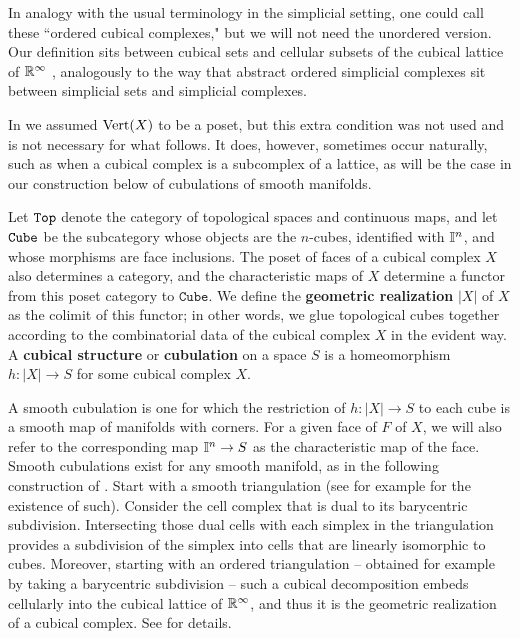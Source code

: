 In analogy with the usual terminology in the simplicial setting, one could call these ``ordered cubical complexes," but we will not need the unordered version.
Our definition sits between cubical sets \cite{jardine2002cubical} and cellular subsets of the cubical lattice of $\mathbb{R}^\infty$ \cite{kaczynski2006computational}, analogously to the way that abstract ordered simplicial complexes sit between simplicial sets and simplicial complexes.
\begin{comment}
	The following geometric realization construction makes our definition and the cubical lattice definition essentially equivalent.
\end{comment}

\begin{remark}
	In \cite{FMS-flows} we assumed ${\rm Vert}(X)$ to be a poset, but this extra condition was not used and is not necessary for what follows.
	It does, however, sometimes occur naturally, such as when a cubical complex is a subcomplex of a lattice, as will be the case in our construction below of cubulations of smooth manifolds.
\end{remark}

Let ${\tt Top}$ denote the category of topological spaces and continuous maps, and let ${\tt Cube}$ be the subcategory whose objects are the $n$-cubes, identified with $\mathbb{I}^n$, and whose morphisms are face inclusions.
The poset of faces of a cubical complex $X$ also determines a category, and the characteristic maps of $X$ determine a functor from this poset category to $\mathtt{Cube}$.
We define the \textbf{geometric realization} $|X|$ of $X$ as the colimit of this functor; in other words, we glue topological cubes together according to the combinatorial data of the cubical complex $X$ in the evident way.
A \textbf{cubical structure} or \textbf{cubulation} on a space $S$ is a homeomorphism $h \colon |X| \to S$ for some cubical complex $X$.

\begin{comment}
	We abuse notation and write $h \circ \iota_{|\sigma|}$ simply as $\iota_\sigma$ for any $\sigma \in X$ when a cubical structure $h \colon |X| \to S$ is understood.
\end{comment}

A smooth cubulation is one for which the restriction of $h \colon |X| \to S$ to each cube is a smooth map of manifolds with corners.
For a given face of $F$ of $X$, we will also refer to the corresponding map $\mathbb{I}^n \to S$ as the characteristic map of the face.
Smooth cubulations exist for any smooth manifold, as in the following construction of \cite{ShSh92}.
Start with a smooth triangulation (see for example \cite[Theorem 10.6]{MUNK66} for the existence of such).
Consider the cell complex that is dual to its barycentric subdivision.
Intersecting those dual cells with each simplex in the triangulation provides a subdivision of the simplex into cells that are linearly isomorphic to cubes.
Moreover, starting with an ordered triangulation -- obtained for example by taking a barycentric subdivision -- such a cubical decomposition embeds cellularly into the cubical lattice of $\mathbb{R}^\infty$, and thus it is the geometric realization of a cubical complex.
See \cite{ShSh92} for details.


